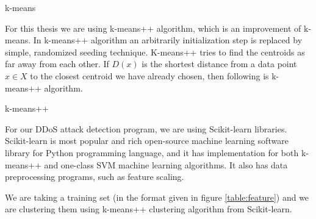 \documentclass[12pt,oneside,a4paper]{article}
\begin{document}
\begin{algorithm}[H]
\caption{k-means}\label{k-means}
\begin{algorithmic}[1]
  \Repeat
\end{algorithmic}
\end{algorithm}

For this thesis we are using k-means++ algorithm, which is an improvement of k-means. In k-means++ algorithm an arbitrarily initialization step is replaced by simple, randomized seeding technique. K-means++ tries to find the centroids as far away from each other. If $D(x)$ is the shortest distance from a data point $x \in X$ to the closest centroid we have already chosen, then following is k-means++ algorithm\cite{k-means++}.

\begin{algorithm}[H]
\caption{k-means++}\label{k-means++}
\begin{algorithmic}[1]
\end{algorithmic}
\end{algorithm}

For our DDoS attack detection program, we are using Scikit-learn libraries. Scikit-learn is most popular and rich open-source machine learning software library for Python programming language, and it has implementation for both k-means++ and one-class SVM machine learning algorithms. It also has data preprocessing programs, such as feature scaling.

We are taking a training set (in the format given in figure \ref{table:feature}) and we are clustering them using k-means++ clustering algorithm from Scikit-learn.
\end{document}
